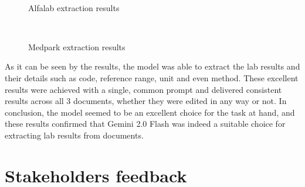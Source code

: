 \begin{figure}[ht]
    \centering
    \\[\baselineskip]
    \caption{Alfalab extraction results}\label{fig:alfalab}
\end{figure}

\begin{figure}[ht]
    \centering
    \\[\baselineskip]
    \caption{Medpark extraction results}\label{fig:medpark}
\end{figure}

\FloatBarrier{}

As it can be seen by the results, the model was able to extract the lab results and their details such as code, reference range, unit and even method. These excellent results were achieved with a single, common prompt and delivered consistent results across all 3 documents, whether they were edited in any way or not. In conclusion, the model seemed to be an excellent choice for the task at hand, and these results confirmed that Gemini 2.0 Flash was indeed a suitable choice for extracting lab results from documents.

\section{Stakeholders feedback}